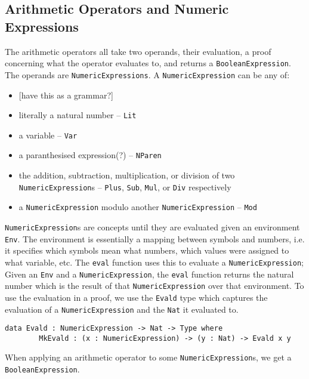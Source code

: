     \subsection{Arithmetic Operators and Numeric Expressions}
        The arithmetic operators all take two operands, their evaluation, a proof concerning what the operator evaluates to, and returns a \texttt{BooleanExpression}.
        The operands are \texttt{NumericExpressions}. A \texttt{NumericExpression} can be any of:
        \begin{itemize}
            \item {[have this as a grammar?]}
            \item literally a natural number -- \texttt{Lit}
            \item a variable -- \texttt{Var}
            \item a paranthesised expression(?) -- \texttt{NParen}
            \item the addition, subtraction, multiplication, or division of two
                  \texttt{NumericExpression}s -- \texttt{Plus}, \texttt{Sub},
                  \texttt{Mul}, or \texttt{Div} respectively
            \item a \texttt{NumericExpression} modulo another 
                  \texttt{NumericExpression} -- \texttt{Mod}
        \end{itemize}
        \texttt{NumericExpression}s are concepts until they are evaluated given an environment \texttt{Env}. The environment is essentially a mapping between symbols and numbers, i.e. it specifies which symbols mean what numbers, which values were assigned to what variable, etc. The \texttt{eval} function uses this to evaluate a \texttt{NumericExpression}; Given an \texttt{Env} and a \texttt{NumericExpression}, the \texttt{eval} function returns the natural number which is the result of that \texttt{NumericExpression} over that environment. To use the evaluation in a proof, we use the \texttt{Evald} type which captures the evaluation of a \texttt{NumericExpression} and the \texttt{Nat} it evaluated to.
        \begin{lstlisting}[caption={\texttt{Evald} as defined in the \textsc{TeamPlay} DSL}]
    data Evald : NumericExpression -> Nat -> Type where
        MkEvald : (x : NumericExpression) -> (y : Nat) -> Evald x y
        \end{lstlisting}
        When applying an arithmetic operator to some \texttt{NumericExpression}s, we get a \texttt{BooleanExpression}.
    
